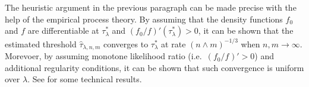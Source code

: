 \documentclass[a4paper,11pt]{article}
\theoremstyle{plain}
\theoremstyle{definition}
\theoremstyle{plain}
\newcommand{\No}{{n}}
\newcommand{\NoNc}{m}
\newcommand{\pdfTestStatistics}[1]{{f_{#1}}}
\newcommand{\pdfTestStatisticsNull}{{f_{0}}}
\newcommand{\localFDR}{\text{local-FDR}}
\newcommand{\EmpiricalThreshold}{{\hat{\tau}_{\lambda, \No, \NoNc}}}
\begin{document}

The heuristic argument in the previous paragraph can be made precise
with the help of the empirical process theory. By assuming that the
density functions $f_0$ and $f$ are
differentiable at $\tau_{\lambda}^{*}$ and $(f_0/f)'(\tau_{\lambda}^{*})
> 0$, it can be shown that the estimated threshold
$\EmpiricalThreshold$ converges to $\tau_{\lambda}^{*}$ at
rate $(\No \wedge \NoNc)^{-1/3}$ when $n, m \to \infty$. Morevoer, by
assuming monotone likelihood ratio (i.e.\
$(\pdfTestStatisticsNull{}/\pdfTestStatistics{})'>0$) and
additional regularity conditions, it can be shown that such
convergence is uniform over $\lambda$. See  for some technical results.


\end{document}
